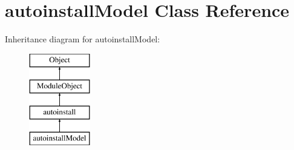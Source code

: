 \hypertarget{classautoinstallModel}{}\section{autoinstall\+Model Class Reference}
\label{classautoinstallModel}
Inheritance diagram for autoinstall\+Model\+:\begin{figure}[H]
\begin{center}
\leavevmode
\includegraphics[height=4.000000cm]{classautoinstallModel}
\end{center}
\end{figure}
